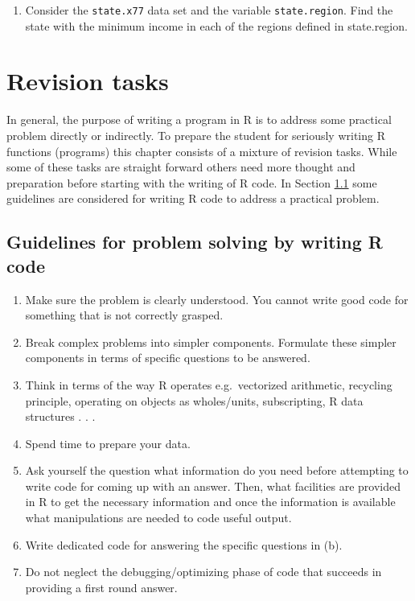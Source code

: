 \documentclass[
]{book}
\providecommand{\tightlist}{%
  \setlength{\itemsep}{0pt}\setlength{\parskip}{0pt}}
\begin{document}
\begin{enumerate}
\def\labelenumi{\arabic{enumi}.}
\setcounter{enumi}{5}
\tightlist
\item
  Consider the \texttt{state.x77} data set and the variable \texttt{state.region}. Find the state with the minimum income in each of the regions defined in state.region.
\end{enumerate}

\chapter{Revision tasks}\label{revision}

In general, the purpose of writing a program in R is to address some practical problem directly or indirectly. To prepare the student for seriously writing R functions (programs) this chapter consists of a mixture of revision tasks. While some of these tasks are straight forward others need more thought and preparation before starting with the writing of R code. In Section \ref{guidelines} some guidelines are considered for writing R code to address a practical problem.

\section{Guidelines for problem solving by writing R code}\label{guidelines}

\begin{enumerate}
\def\labelenumi{(\alph{enumi})}
\item
  Make sure the problem is clearly understood. You cannot write good code for something that is not correctly grasped.
\item
  Break complex problems into simpler components. Formulate these simpler components in terms of specific questions to be answered.
\item
  Think in terms of the way R operates e.g.~vectorized arithmetic, recycling principle, operating on objects as wholes/units, subscripting, R data structures . . .
\item
  Spend time to prepare your data.
\item
  Ask yourself the question what information do you need before attempting to write code for coming up with an answer. Then, what facilities are provided in R to get the necessary information and once the information is available what manipulations are needed to code useful output.
\item
  Write dedicated code for answering the specific questions in (b).
\item
  Do not neglect the debugging/optimizing phase of code that succeeds in providing a first round answer.
\end{enumerate}
\end{document}
